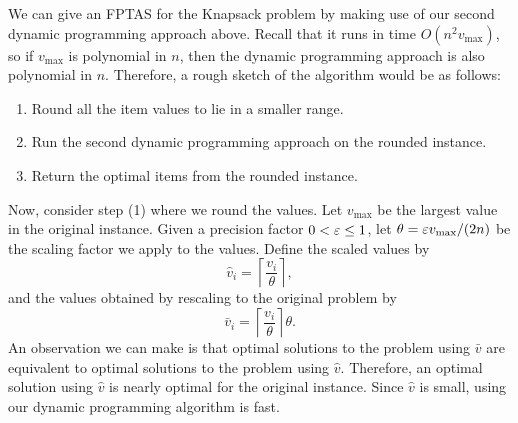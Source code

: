 We can give an FPTAS for the {\sc Knapsack} problem by making use of our 
second dynamic programming approach above. Recall that it runs in time 
$O(n^2 v_{\max})$, so if $v_{\max}$ is polynomial in $n$, then the 
dynamic programming approach is also polynomial in $n$. Therefore, 
a rough sketch of the algorithm would be as follows: 
\begin{enumerate}[(1)]
    \item Round all the item values to lie in a smaller range. 
    \item Run the second dynamic programming approach on the rounded instance. 
    \item Return the optimal items from the rounded instance. 
\end{enumerate}
Now, consider step (1) where we round the values. Let $v_{\max}$ be the 
largest value in the original instance. Given a precision factor 
$0 < \varepsilon \leq 1$, let $\theta = \varepsilon v_{\max} / (2n)$ be the scaling 
factor we apply to the values. Define the scaled values by 
\[ \hat{v}_i = \left\lceil \frac{v_i}{\theta} \right\rceil, \] 
and the values obtained by rescaling to the original problem by 
\[ \bar{v}_i = \left\lceil \frac{v_i}{\theta} \right\rceil \theta. \] 
An observation we can make is that optimal solutions to the problem 
using $\bar v$ are equivalent to optimal solutions to the problem using 
$\hat v$. Therefore, an optimal solution using $\hat v$ is nearly optimal 
for the original instance. Since $\hat v$ is small, using our dynamic 
programming algorithm is fast. 

